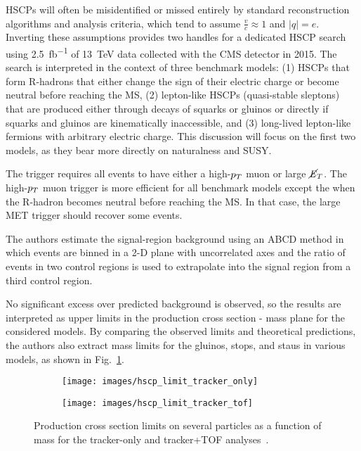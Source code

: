 \documentclass[12pt]{article}
\begin{document}
        HSCPs will often be misidentified or missed entirely by standard reconstruction algorithms and analysis criteria, which tend to assume $\frac{v}{c} \approx \num{1}$ and $\lvert q \rvert = e$. Inverting these assumptions provides two handles for a dedicated HSCP search using \SI{2.5}{\femto\barn^{-1}} of \SI{13}{\tera\electronvolt} data collected with the CMS detector in 2015. The search is interpreted in the context of three benchmark models: (1) HSCPs that form R-hadrons that either change the sign of their electric charge or become neutral before reaching the MS, (2) lepton-like HSCPs (quasi-stable sleptons) that are produced either through decays of squarks or gluinos or directly if squarks and gluinos are kinematically inaccessible, and (3) long-lived lepton-like fermions with arbitrary electric charge. This discussion will focus on the first two models, as they bear more directly on naturalness and SUSY.

        The trigger requires all events to have either a high-$p_T$ muon or large $\cancel{\it{E}}_{T}$. The high-$p_T$ muon trigger is more efficient for all benchmark models except the when the R-hadron becomes neutral before reaching the MS. In that case, the large MET trigger should recover some events.

        The authors estimate the signal-region background using an ABCD method in which events are binned in a 2-D plane with uncorrelated axes and the ratio of events in two control regions is used to extrapolate into the signal region from a third control region.

        No significant excess over predicted background is observed, so the results are interpreted as upper limits in the production cross section - mass plane for the considered models. By comparing the observed limits and theoretical predictions, the authors also extract mass limits for the gluinos, stops, and staus in various models, as shown in Fig.~\ref{hscp_limits}.

        \noindent \begin{figure}[htbp] \begin{center}
        \begin{subfigure}[htbp]{0.45\textwidth} \begin{center}
        \texttt{[image: images/hscp\_limit\_tracker\_only]}
        \end{center} \end{subfigure}
        \begin{subfigure}[htbp]{0.45\textwidth} \begin{center}
        \texttt{[image: images/hscp\_limit\_tracker\_tof]}
        \end{center} \end{subfigure}
        \caption{Production cross section limits on several particles as a function of mass for the tracker-only and tracker+TOF analyses~\cite{cms_hscp}.}
        \label{hscp_limits}
        \end{center} \end{figure}
\end{document}
